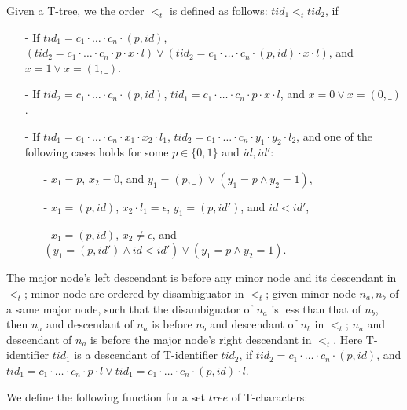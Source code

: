 Given a T-tree, we the order $<_t$ is defined as follows: $tid_1 <_t tid_2$, if

\begin{itemize}
\setlength{\itemsep}{0.5pt}
\item[-] If $tid_1 = c_1 \cdot \ldots \cdot c_n \cdot (p,id)$, $(tid_2 = c_1 \cdot \ldots \cdot c_n \cdot p \cdot x \cdot l) \vee (tid_2 = c_1 \cdot \ldots \cdot c_n \cdot (p,id) \cdot x \cdot l)$, and $x=1 \vee x=(1,\_)$.

\item[-] If $tid_2 = c_1 \cdot \ldots \cdot c_n \cdot (p,id)$, $tid_1 = c_1 \cdot \ldots \cdot c_n \cdot p \cdot x \cdot l$, and $x=0 \vee x=(0,\_)$.

\item[-] If $tid_1 = c_1 \cdot \ldots \cdot c_n \cdot x_1 \cdot x_2 \cdot l_1$, $tid_2 = c_1 \cdot \ldots \cdot c_n \cdot y_1 \cdot y_2 \cdot l_2$, and one of the following cases holds for some $p \in \{ 0,1 \}$ and $id,id'$:

    \begin{itemize}
    \setlength{\itemsep}{0.5pt}
    \item[-] $x_1=p$, $x_2=0$, and $y_1=(p,\_) \vee (y_1=p \wedge y_2=1)$,

    \item[-] $x_1=(p,id)$, $x_2 \cdot l_1 = \epsilon$, $y_1=(p,id')$, and $id<id'$,

    \item[-] $x_1=(p,id)$, $x_2 \neq \epsilon$, and $(y_1 = (p,id') \wedge id<id') \vee (y_1=p \wedge y_2=1)$.
    \end{itemize}
\end{itemize}

The major node's left descendant is before any minor node and its descendant in $<_t$; minor node are ordered by disambiguator in $<_t$; given minor node $n_a,n_b$ of a same major node, such that the disambiguator of $n_a$ is less than that of $n_b$, then $n_a$ and descendant of $n_a$ is before $n_b$ and descendant of $n_b$ in $<_t$; $n_a$ and descendant of $n_a$ is before the major node's right descendant in $<_t$. Here T-identifier $tid_1$ is a descendant of T-identifier $tid_2$, if $tid_2 = c_1 \cdot \ldots \cdot c_n \cdot (p,id)$, and $tid_1 = c_1 \cdot \ldots \cdot c_n \cdot p \cdot l \vee tid_1 = c_1 \cdot \ldots \cdot c_n \cdot (p,id) \cdot l$.

We define the following function for a set $tree$ of T-characters:

